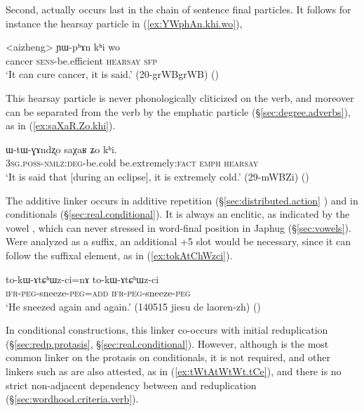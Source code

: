 Second,  actually occurs last in the chain of sentence final particles. It follows for instance the hearsay particle  in (\ref{ex:YWphAn.khi.wo}), 

\begin{exe}
\ex \label{ex:YWphAn.khi.wo}
\gll <aizheng> ɲɯ-pʰɤn kʰi wo\\
cancer \textsc{sens}-be.efficient \textsc{hearsay} \textsc{sfp} \\
\glt `It can cure cancer, it is said.' (20-grWBgrWB) 	()
\end{exe}

This hearsay particle is never phonologically cliticized on the verb, and moreover can be separated from the verb by the emphatic particle  (§\ref{sec:degree.adverbs}), as in (\ref{ex:saXaR.Zo.khi}).

\begin{exe}
\ex \label{ex:saXaR.Zo.khi}
\gll ɯ-tɯ-ɣɤndʐo saχaʁ ʑo kʰi. \\
\textsc{3sg}.\textsc{poss}-\textsc{nmlz}:\textsc{deg}-be.cold be.extremely:\textsc{fact} \textsc{emph} \textsc{hearsay} \\
\glt `It is said that [during an eclipse], it is extremely cold.' (29-mWBZi) 	()
\end{exe}

The additive linker  occurs in additive repetition (§\ref{sec:distributed.action} ) and in conditionals (§\ref{sec:real.conditional}). It is always an enclitic, as indicated by the vowel , which can never stressed in word-final position in Japhug (§\ref{sec:vowels}).  Were  analyzed as a suffix, an additional +5 slot would be necessary, since it can follow the  suffixal element, as in (\ref{ex:tokAtChWzci}).

\begin{exe}
\ex \label{ex:tokAtChWzci}
\gll to-kɯ-ɤtɕʰɯz-ci=nɤ to-kɯ-ɤtɕʰɯz-ci \\
\textsc{ifr}-\textsc{peg}-sneeze-\textsc{peg}=\textsc{add} \textsc{ifr}-\textsc{peg}-sneeze-\textsc{peg}  \\
\glt `He sneezed again and again.' (140515 jiesu de laoren-zh) ()
\end{exe}

In conditional constructions, this linker co-occurs with initial reduplication (§\ref{sec:redp.protasis}, §\ref{sec:real.conditional}). However, although  is the most common linker on the protasis on conditionals, it is not required, and other linkers such as  are also attested, as in (\ref{ex:tWtAtWtWt.tCe}), and there is no strict non-adjacent dependency between  and reduplication (§\ref{sec:wordhood.criteria.verb}).

